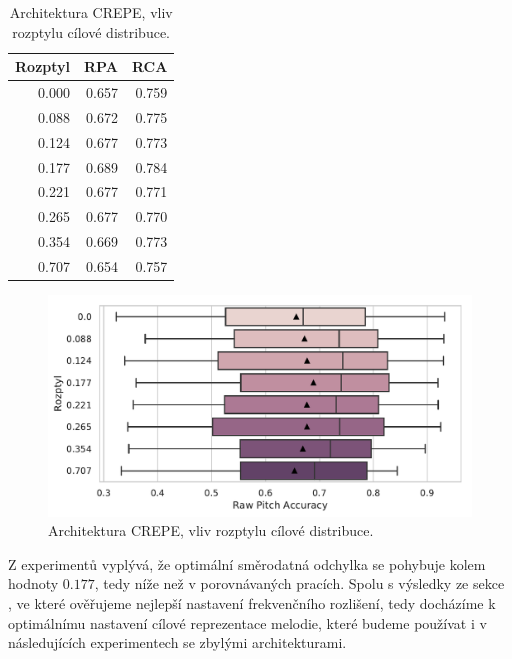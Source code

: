 \begin{table}[h!]
\centering
    \begin{tabular}{rrr}
    \toprule
    Rozptyl &   RPA &   RCA \\
    \midrule
    0.000 & 0.657 & 0.759 \\
    0.088 & 0.672 & 0.775 \\
    0.124 & 0.677 & 0.773 \\
    0.177 & 0.689 & 0.784 \\
    0.221 & 0.677 & 0.771 \\
    0.265 & 0.677 & 0.770 \\
    0.354 & 0.669 & 0.773 \\
    0.707 & 0.654 & 0.757 \\
    \bottomrule
    \end{tabular}

\caption{Architektura CREPE, vliv rozptylu cílové distribuce.}\label{tab:crepe_diskretizace}
\end{table}

\begin{figure}[h]\centering
    \includegraphics[scale=0.6]{../img/figures/crepe_rozptyl.pdf}
\caption{Architektura CREPE, vliv rozptylu cílové distribuce.}\label{obr:crepe_diskretizace}
\end{figure}

Z experimentů vyplývá, že optimální směrodatná odchylka se pohybuje kolem hodnoty $0.177$, tedy níže než v porovnávaných pracích. Spolu s výsledky ze sekce , ve které ověřujeme nejlepší nastavení frekvenčního rozlišení, tedy docházíme k optimálnímu nastavení cílové reprezentace melodie, které budeme používat i v následujících experimentech se zbylými architekturami.


